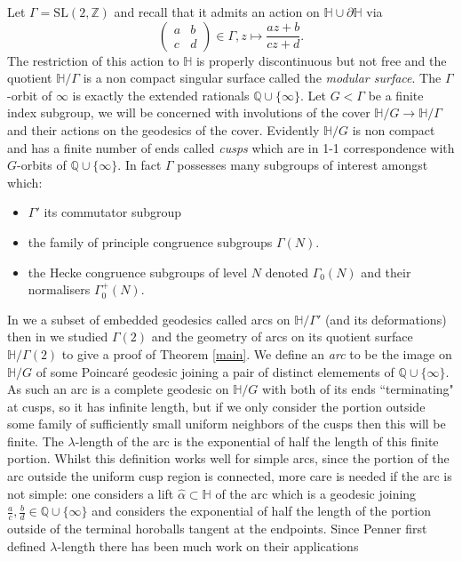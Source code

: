 \documentclass[12pt,a4paper]{amsart}
\def\HH{\mathbb{H}}
\def\dHH{\partial \mathbb{H}}
\def\g2{\Gamma(2)}
\def\xx{\HH/\g2}
\def\ZZ{\mathbb{Z}}
\def\qqq{\mathbb{Q} \cup \{\infty\}}
\def\sl2{\mathrm{SL}(2, \ZZ)}
\begin{document}
Let $\Gamma = \sl2$ and recall  that it admits an action on $\mathbb{H}\cup \dHH$ via
$$
\begin{pmatrix} a&b\\c&d \end{pmatrix} \in \Gamma,
z \mapsto \frac{az + b}{cz + d}.
$$
The restriction of this action to $\mathbb{H}$ is properly
discontinuous but not free and the quotient $\mathbb{H}/\Gamma$ is a non compact singular surface
called the \textit{modular surface}.
The $\Gamma$-orbit of $\infty$ is exactly the extended rationals $\mathbb{Q}\cup \{\infty\}$.
Let $G<\Gamma$ be a finite index subgroup, we will be concerned with involutions of the cover
$\mathbb{H}/G\rightarrow \mathbb{H}/\Gamma$ and their actions on the
geodesics of the cover.
Evidently $\mathbb{H}/G$ is non compact and has a finite number of
ends called \textit{cusps} which are in 1-1 correspondence 
with  $G$-orbits of $\qqq$.
In fact $\Gamma$ possesses many subgroups of interest amongst which:
\begin{itemize}
	\item $\Gamma'$ its commutator subgroup
	\item the family of principle congruence subgroups
		$\Gamma(N)$.
	\item the Hecke congruence subgroups of level $N$
		 denoted $\Gamma_0(N)$ and their normalisers
		 $\Gamma_0^+(N)$.
\end{itemize}
In \cite{thesis} we a subset of embedded geodesics called arcs on
$\mathbb{H}/\Gamma'$ (and its deformations)
then in
\cite{vlad} we studied $\Gamma(2)$ and the geometry of arcs on its quotient surface $\xx$
to give a proof of Theorem \ref{main}.
We define an \textit{arc} to be the image on $\mathbb{H}/G$ of some
Poincaré geodesic joining  a pair of distinct elemements of $\qqq$.
As such an arc is a complete geodesic on  $\mathbb{H}/G$ with both
of its ends ``terminating" at cusps, 
so it has infinite length, but if we only consider the portion outside some
family of sufficiently small uniform neighbors of the cusps then
this will be finite. 
The $\lambda$-length
of the arc is the exponential of half the length of this finite portion.
Whilst this definition works well for simple arcs, 
since the portion of the arc
outside the uniform cusp region is connected, more care is needed if
the arc is not simple:
one considers a lift $\hat{\alpha}\subset \mathbb{H}$ of the arc
which is a geodesic joining $\frac{a}{c}, \frac{b}{d}\in \qqq$ and
considers the exponential of half the length 
of the portion outside of the terminal horoballs
tangent at the endpoints.
Since Penner \cite{bob} first defined $\lambda$-length 
there has been much work on their applications
\end{document}
